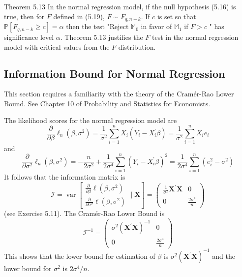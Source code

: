 \documentclass[10pt]{article}
\begin{document}
Theorem 5.13 In the normal regression model, if the null hypothesis (5.16) is true, then for $F$ defined in (5.19), $F \sim F_{q, n-k}$. If $c$ is set so that $\mathbb{P}\left[F_{q, n-k} \geq c\right]=\alpha$ then the test "Reject $\mathbb{M}_{0}$ in favor of $\mathbb{M}_{1}$ if $F>c$ " has significance level $\alpha$. Theorem $5.13$ justifies the $F$ test in the normal regression model with critical values from the $F$ distribution.

\subsection{Information Bound for Normal Regression}
This section requires a familiarity with the theory of the Cramér-Rao Lower Bound. See Chapter 10 of Probability and Statistics for Economists.

The likelihood scores for the normal regression model are
$$
\frac{\partial}{\partial \beta} \ell_{n}\left(\beta, \sigma^{2}\right)=\frac{1}{\sigma^{2}} \sum_{i=1}^{n} X_{i}\left(Y_{i}-X_{i}^{\prime} \beta\right)=\frac{1}{\sigma^{2}} \sum_{i=1}^{n} X_{i} e_{i}
$$
and
$$
\frac{\partial}{\partial \sigma^{2}} \ell_{n}\left(\beta, \sigma^{2}\right)=-\frac{n}{2 \sigma^{2}}+\frac{1}{2 \sigma^{4}} \sum_{i=1}^{n}\left(Y_{i}-X_{i}^{\prime} \beta\right)^{2}=\frac{1}{2 \sigma^{4}} \sum_{i=1}^{n}\left(e_{i}^{2}-\sigma^{2}\right)
$$
It follows that the information matrix is
$$
\mathscr{I}=\operatorname{var}\left[\begin{array}{c}
\frac{\partial}{\partial \beta} \ell\left(\beta, \sigma^{2}\right) \\
\frac{\partial}{\partial \sigma^{2}} \ell\left(\beta, \sigma^{2}\right)
\end{array} \mid \boldsymbol{X}\right]=\left(\begin{array}{cc}
\frac{1}{\sigma^{2}} \boldsymbol{X}^{\prime} \boldsymbol{X} & 0 \\
0 & \frac{2 \sigma^{4}}{n}
\end{array}\right)
$$
(see Exercise 5.11). The Cramér-Rao Lower Bound is
$$
\mathscr{I}^{-1}=\left(\begin{array}{cc}
\sigma^{2}\left(\boldsymbol{X}^{\prime} \boldsymbol{X}\right)^{-1} & 0 \\
0 & \frac{2 \sigma^{4}}{n}
\end{array}\right)
$$
This shows that the lower bound for estimation of $\beta$ is $\sigma^{2}\left(\boldsymbol{X}^{\prime} \boldsymbol{X}\right)^{-1}$ and the lower bound for $\sigma^{2}$ is $2 \sigma^{4} / n$.
\end{document}
